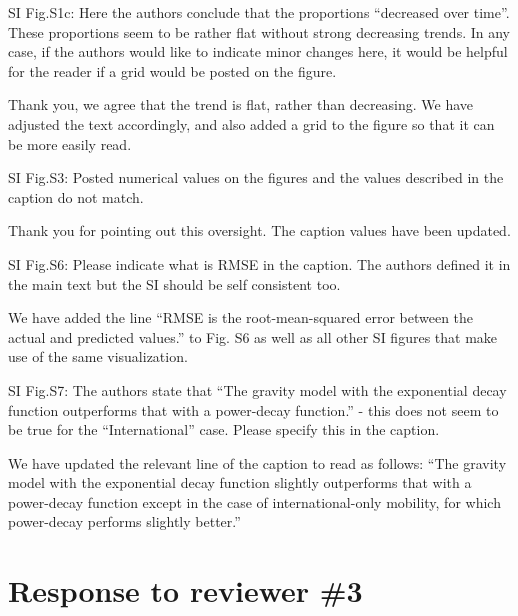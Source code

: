 \documentclass[12pt,a4paper]{article}
\newcommand{\response}[1]{{\leavevmode\noindent #1}}
\newcommand{\rcomment}[1]{%
\vspace{10pt}
\begin{tcolorbox}[colback=black!3,colframe=white!45!black]
#1
\end{tcolorbox}
}
\begin{document}
\rcomment{
SI Fig.S1c: Here the authors conclude that the proportions “decreased over time”. These proportions seem to be rather flat without strong decreasing trends. In any case, if the authors would like to indicate minor changes here, it would be helpful for the reader if a grid would be posted on the figure.


}
\response{

Thank you, we agree that the trend is flat, rather than decreasing. We have adjusted the text accordingly, and also added a grid to the figure so that it can be more easily read. 

}

\rcomment{

SI Fig.S3: Posted numerical values on the figures and the values described in the caption do not match.


}
\response{

Thank you for pointing out this oversight. The caption values have been updated. 

}

\rcomment{
SI Fig.S6: Please indicate what is RMSE in the caption. The authors defined it in the main text but the SI should be self consistent too.

}
\response{
We have added the line “RMSE is the root-mean-squared error between the actual and predicted values.” to Fig. S6 as well as all other SI figures that make use of the same visualization.
}

\rcomment{

SI Fig.S7: The authors state that “The gravity model with the exponential decay function outperforms that with a power-decay function.” - this does not seem to be true for the “International” case. Please specify this in the caption.


}
\response{
We have updated the relevant line of the caption to read as follows: 
“The gravity model with the exponential decay function slightly outperforms that with a power-decay function except in the case of international-only mobility, for which power-decay performs slightly better.”

}

\section*{Response to reviewer \#3}
\end{document}

